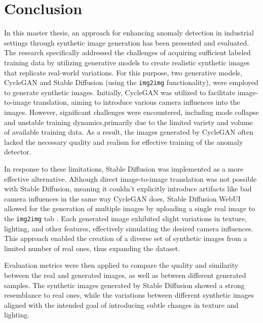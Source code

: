 \documentclass[12pt,DIV14,BCOR12mm,a4paper,footinclude=false,headinclude,parskip=half-,twoside,openright,cleardoublepage=empty,toc=index,bibliography=totoc,listof=totoc]{scrreprt}
\numberwithin{equation}{chapter}
\begin{document}
\chapter{Conclusion}
\label{chapter5}

In this master thesis, an approach for enhancing anomaly detection in industrial settings through synthetic image generation has been presented and evaluated. The research specifically addressed the challenges of acquiring sufficient labeled training data by utilizing generative models to create realistic synthetic images that replicate real-world variations. For this purpose, two generative models, CycleGAN and Stable Diffusion (using the \texttt{img2img} functionality), were employed to generate synthetic images. Initially, CycleGAN was utilized to facilitate image-to-image translation, aiming to introduce various camera influences into the images. However, significant challenges were encountered, including mode collapse and unstable training dynamics,primarily due to the limited variety and volume of available training data. As a result, the images generated by CycleGAN often lacked the necessary quality and realism for effective training of the anomaly detector.

In response to these limitations, Stable Diffusion was implemented as a more effective alternative. Although direct image-to-image translation was not possible with Stable Diffusion, meaning it couldn't explicitly introduce artifacts like bad camera influences in the same way CycleGAN does, Stable Diffusion WebUI allowed for the generation of multiple images by uploading a single real image to the \texttt{img2img} tab . Each generated image exhibited slight variations in texture, lighting, and other features, effectively simulating the desired camera influences. This approach enabled the creation of a diverse set of synthetic images from a limited number of real ones, thus expanding the dataset.

Evaluation metrics were then applied to compare the quality and similarity between the real and generated images, as well as between different generated samples. The synthetic images generated by Stable Diffusion showed a strong resemblance to real ones, while the variations between different synthetic images aligned with the intended goal of introducing subtle changes in texture and lighting.
\end{document}
